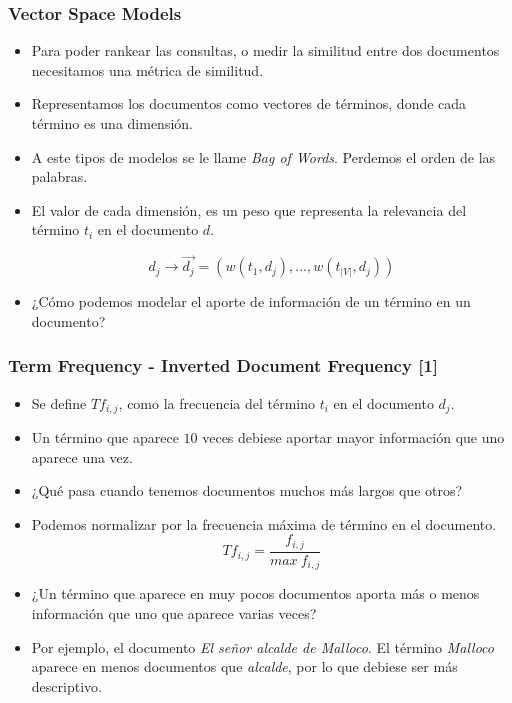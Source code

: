 \documentclass[handout]{beamer}
\begin{document}
\begin{frame}\frametitle{Vector Space Models}
\footnotesize{
\begin{itemize}
 \item Para poder rankear las consultas, o medir la similitud entre dos documentos necesitamos una métrica de similitud.
 \item Representamos los documentos como vectores de términos, donde cada término es una dimensión.
 \item A este tipos de modelos se le llame \emph{Bag of Words}. Perdemos el orden de las palabras. 
 \item El valor de cada dimensión, es un peso que representa la relevancia del término $t_{i}$ en el documento $d$.

\begin{equation}
 d_{j} \rightarrow \overrightarrow{d_{j}}=(w(t_{1},d_{j}),...,w(t_{|V|},d_{j}))
\end{equation}

\item ¿Cómo podemos modelar el aporte de información de un término en un documento?
 
\end{itemize}

}
 
\end{frame}

\begin{frame}\frametitle{Term Frequency - Inverted Document Frequency [1]}
\footnotesize{
\begin{itemize}
 \item Se define $Tf_{i,j}$, como la frecuencia del término $t_{i}$ en el documento $d_{j}$.
 \item Un término que aparece $10$ veces debiese aportar mayor información que uno aparece una vez.
 \item ¿Qué pasa cuando tenemos documentos muchos más largos que otros?
 \item Podemos normalizar por la frecuencia máxima de término en el documento. 
\begin{displaymath}
 Tf_{i,j}=\frac{f_{i,j}}{max \ f_{i,j}}
\end{displaymath}
\item ¿Un término que aparece en muy pocos documentos aporta más o menos información que uno que aparece varias veces?
\item Por ejemplo, el documento \emph{El señor alcalde de Malloco}. El término \emph{Malloco} aparece en menos documentos que \emph{alcalde}, por lo que debiese ser más descriptivo. 
\end{itemize}


} 
\end{frame}
\end{document}
